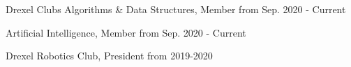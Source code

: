 
\begin{cvskills}
  \cvskill
  {Drexel Clubs}
  {Algorithms \& Data Structures, Member from Sep. 2020 - Current}
  
  \cvskill
  {}
  {Artificial Intelligence, Member from Sep. 2020 - Current}
  
  \cvskill
  {}
  {Drexel Robotics Club, President from 2019-2020}
\end{cvskills}